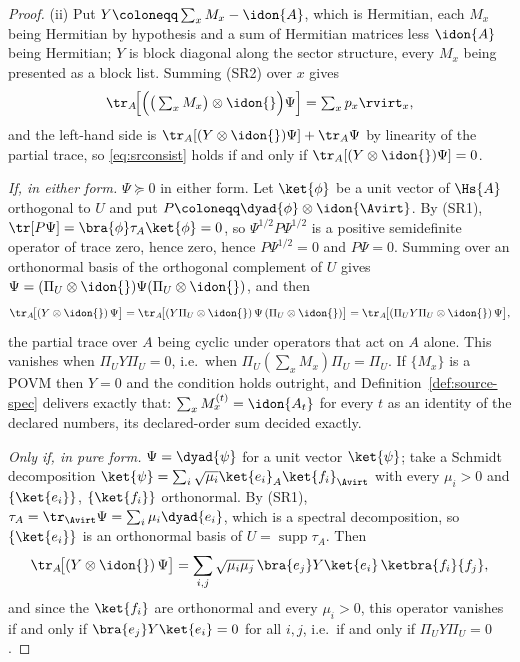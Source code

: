 \begin{proof}
(ii) Put $Y\coloneqq\sum_xM_x-\idon{A}$, which is Hermitian, each $M_x$
being Hermitian by hypothesis and a sum of Hermitian matrices less
$\idon{A}$ being Hermitian; $Y$ is block diagonal along the sector structure,
every $M_x$ being presented as a block list. Summing (SR2) over $x$ gives
\begin{equation*}
  \tr_A\!\Big[\Big(\big(\textstyle\sum_xM_x\big)\otimes\idon{}\Big)\Psi\Big]
  =\sum_xp_x\rvirt_x ,
\end{equation*}
and the left-hand side is $\tr_A[(Y\otimes\idon{})\Psi]+\tr_A\Psi$ by
linearity of the partial trace, so \eqref{eq:srconsist} holds if and only
if $\tr_A[(Y\otimes\idon{})\Psi]=0$.

\emph{If, in either form.} $\Psi\succeq0$ in either form. Let $\ket{\phi}$
be a unit vector of $\Hs{A}$ orthogonal to $U$ and put
$P\coloneqq\dyad{\phi}\otimes\idon{\Avirt}$. By (SR1),
$\tr[P\Psi]=\bra{\phi}\tau_A\ket{\phi}=0$, so
$\Psi^{1/2}P\Psi^{1/2}$ is a positive semidefinite operator of trace zero,
hence zero, hence $P\Psi^{1/2}=0$ and $P\Psi=0$. Summing over an orthonormal
basis of the orthogonal complement of $U$ gives
$\Psi=(\Pi_U\otimes\idon{})\Psi(\Pi_U\otimes\idon{})$, and then
\begin{equation*}
  \tr_A\!\big[(Y\otimes\idon{})\,\Psi\big]
  =\tr_A\!\big[(Y\Pi_U\otimes\idon{})\,\Psi\,(\Pi_U\otimes\idon{})\big]
  =\tr_A\!\big[(\Pi_UY\Pi_U\otimes\idon{})\,\Psi\big] ,
\end{equation*}
the partial trace over $A$ being cyclic under operators that act on $A$
alone. This vanishes when $\Pi_UY\Pi_U=0$, i.e.\ when
$\Pi_U(\sum_xM_x)\Pi_U=\Pi_U$. If $\{M_x\}$ is a POVM then $Y=0$ and the
condition holds outright, and Definition~\ref{def:source-spec} delivers
exactly that: $\sum_xM^{(t)}_x=\idon{A_t}$ for every $t$ as an identity of
the declared numbers, its declared-order sum decided exactly.

\emph{Only if, in pure form.} $\Psi=\dyad{\psi}$ for a unit vector
$\ket{\psi}$; take a Schmidt decomposition
$\ket{\psi}=\sum_i\sqrt{\mu_i}\ket{e_i}_A\ket{f_i}_{\Avirt}$ with every
$\mu_i>0$ and $\{\ket{e_i}\}$, $\{\ket{f_i}\}$ orthonormal. By (SR1),
$\tau_A=\tr_{\Avirt}\Psi=\sum_i\mu_i\dyad{e_i}$, which is a spectral
decomposition, so $\{\ket{e_i}\}$ is an orthonormal basis of
$U=\operatorname{supp}\tau_A$. Then
\begin{equation*}
  \tr_A\!\big[(Y\otimes\idon{})\,\Psi\big]
  =\sum_{i,j}\sqrt{\mu_i\mu_j}\,\bra{e_j}Y\ket{e_i}\,\ketbra{f_i}{f_j},
\end{equation*}
and since the $\ket{f_i}$ are orthonormal and every $\mu_i>0$, this
operator vanishes if and only if $\bra{e_j}Y\ket{e_i}=0$ for all $i,j$,
i.e.\ if and only if $\Pi_UY\Pi_U=0$.


\end{proof}
